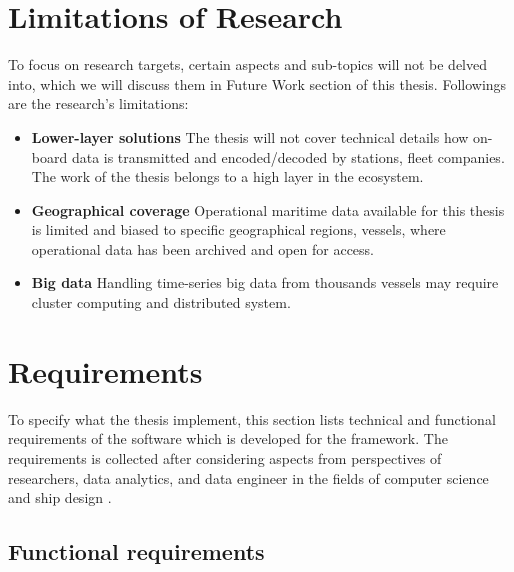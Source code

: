 \section{Limitations of Research}
To focus on research targets, certain aspects and sub-topics will not be delved into, which we will discuss them in Future Work section of this thesis.
Followings are the research's limitations:
\begin{itemize}
    \item \textbf{Lower-layer solutions } 
    The thesis will not cover technical details how on-board data is transmitted and encoded/decoded by stations, fleet companies. The work of the thesis belongs to a high layer in the ecosystem.
    \item \textbf{Geographical coverage} 
    Operational maritime data available for this thesis is limited and biased to specific geographical regions, vessels, where operational data has been archived and open for access. 
    \item \textbf{Big data} Handling time-series big data from thousands vessels may require cluster computing and distributed system.
\end{itemize} 

\section{Requirements}

To specify what the thesis implement, this section lists technical and functional requirements of the software which is developed for the framework. The requirements is collected after considering aspects from perspectives of researchers, data analytics, and data engineer in the fields of computer science and ship design .
\subsection{Functional requirements}

